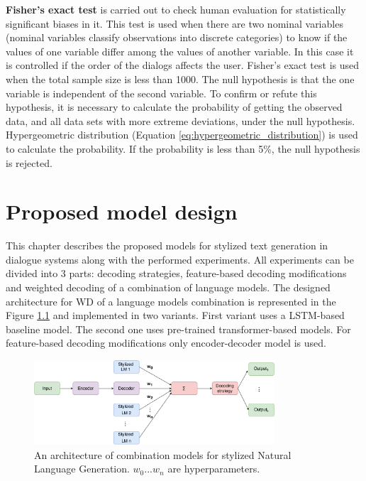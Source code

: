 \textbf{Fisher's exact test} \cite{fisher1922interpretation} is carried out to check human evaluation for statistically significant biases in it. This test is used when there are two nominal variables (nominal variables classify observations into discrete categories) to know if the values of one variable differ among the values of another variable. In this case it is controlled if the order of the dialogs affects the user. 
Fisher's exact test is used when the total sample size is less than 1000. The null hypothesis is that the one variable is independent of the second variable. To confirm or refute this hypothesis, it is necessary to calculate the probability of getting the observed data, and all data sets with more extreme deviations, under the null hypothesis. Hypergeometric distribution (Equation \ref{eq:hypergeometric_distribution}) is used to calculate the probability. If the probability is less than 5\%, the null hypothesis is rejected. 

\chapter{Proposed model design} \label{solution_design}
This chapter describes the proposed models for stylized text generation in dialogue systems along with the performed experiments. All experiments can be divided into 3 parts: decoding strategies, feature-based decoding modifications and weighted decoding of a combination of language models. The designed architecture for WD of a language models combination is represented in the Figure \ref{architecture_nlg} and implemented in two variants. First variant uses a LSTM-based baseline model. The second one uses pre-trained transformer-based models. For feature-based decoding modifications only encoder-decoder model is used.

\begin{figure}[hbt]
  \centering
  \includegraphics[width=0.8\textwidth]{figures/model.pdf}
  \caption{An architecture of combination models for stylized Natural Language Generation. $w_0 ... w_n$ are hyperparameters.}
  \label{architecture_nlg}
\end{figure}

